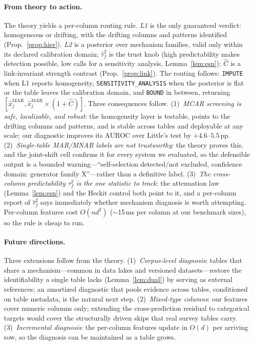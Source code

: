 \documentclass[conference]{IEEEtran}
\begin{document}
\paragraph{From theory to action.} The theory yields a per-column routing rule. \emph{L1}
is the only guaranteed verdict: homogeneous or drifting, with the drifting columns and
patterns identified (Prop.~\ref{prop:hier}). \emph{L2} is a posterior over mechanism
families, valid only within its declared calibration domain; $\hat\tau_f^2$ is the trust
knob (high predictability makes detection possible, low calls for a sensitivity analysis,
Lemma~\ref{lem:esn}); $\hat C$ is a link-invariant strength contrast
(Prop.~\ref{prop:link}). The routing follows: \texttt{IMPUTE} when L1 reports homogeneity,
\texttt{SENSITIVITY\_ANALYSIS} when the posterior is flat or the table leaves the
calibration domain, and \texttt{BOUND} in between, returning
$[\hat x_j^{\mathrm{MAR}}, \hat x_j^{\mathrm{MAR}}\times(1+\hat C)]$. Three consequences
follow. (1)~\emph{MCAR screening is safe, localizable, and robust}: the homogeneity layer is
testable, points to the drifting columns and patterns, and is stable across tables and
deployable at any scale; our diagnostic improves its AUROC over Little's test by
$+4.6$--$5.5$\,pp. (2)~\emph{Single-table MAR/MNAR labels are not trustworthy}: the theory
proves this, and the joint-shift cell confirms it for every system we evaluated, so the
defensible output is a bounded warning---``self-selection detected/not excluded, confidence
domain: generator family X''---rather than a definitive label. (3)~\emph{The cross-column
predictability $\tau_f^2$ is the one statistic to track}: the attenuation law
(Lemma~\ref{lem:esn}) and the Heckit control both point to it, and a per-column report of
$\hat\tau_f^2$ says immediately whether mechanism diagnosis is worth attempting. Per-column
features cost $O(nd^2)$ ($\sim$15\,ms per column at our benchmark sizes), so the rule is cheap
to run.

\paragraph{Future directions.} Three extensions follow from the theory. (1)~\emph{Corpus-level
diagnosis}: tables that share a mechanism---common in data lakes and versioned
datasets---restore the identifiability a single table lacks (Lemma~\ref{lem:dual}) by serving
as external references; an amortized diagnostic that pools evidence across tables, conditioned
on table metadata, is the natural next step. (2)~\emph{Mixed-type columns}: our features cover
numeric columns only; extending the cross-prediction residual to categorical targets would
cover the structurally driven skips that real survey tables carry. (3)~\emph{Incremental
diagnosis}: the per-column features update in $O(d)$ per arriving row, so the diagnosis can be
maintained as a table grows.
\end{document}
